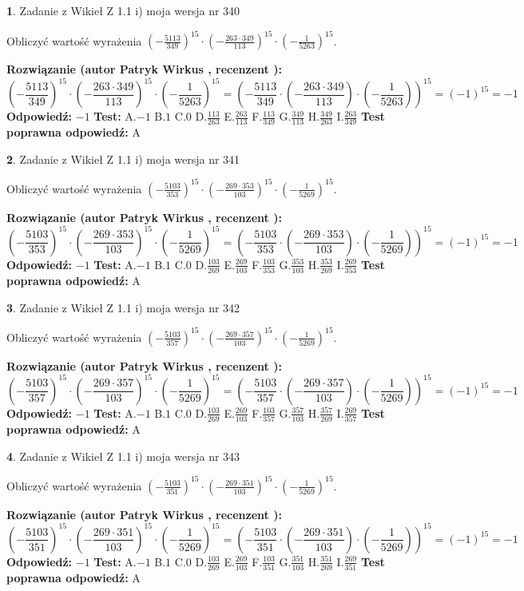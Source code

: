 \documentclass[12pt, a4paper]{article}
\theoremstyle{definition} %
\newtheorem{zad}{}
\newcommand{\zadStart}[1]{\begin{zad}#1\newline}
\newcommand{\zadStop}{\end{zad}}
\newcommand{\rozwStart}[2]{\noindent \textbf{Rozwiązanie (autor #1 , recenzent #2): }\newline}
\newcommand{\rozwStop}{\newline}
\newcommand{\odpStart}{\noindent \textbf{Odpowiedź:}\newline}
\newcommand{\odpStop}{\newline}
\newcommand{\testStart}{\noindent \textbf{Test:}\newline}
\newcommand{\testStop}{\newline}
\newcommand{\kluczStart}{\noindent \textbf{Test poprawna odpowiedź:}\newline}
\newcommand{\kluczStop}{\newline}
\begin{document}
\zadStart{Zadanie z Wikieł Z 1.1 i) moja wersja nr 340}

Obliczyć wartość wyrażenia $(-\frac{5113}{349})^{15} \cdot (-\frac{263 \cdot 349}{113})^{15} \cdot (-\frac{1}{5263})^{15}$.
\zadStop
\rozwStart{Patryk Wirkus}{}
$$(-\frac{5113}{349})^{15} \cdot (-\frac{263 \cdot 349}{113})^{15} \cdot (-\frac{1}{5263})^{15} = (-\frac{5113}{349} \cdot (-\frac{263 \cdot 349}{113}) \cdot (-\frac{1}{5263}))^{15} = (-1)^{15} = -1$$
\rozwStop
\odpStart
$-1$
\odpStop
\testStart
A.$-1$ B.$1$ C.$0$ D.$\frac{113}{263}$ E.$\frac{263}{113}$
F.$\frac{113}{349}$ G.$\frac{349}{113}$
H.$\frac{349}{263}$
I.$\frac{263}{349}$
\testStop
\kluczStart
A
\kluczStop



\zadStart{Zadanie z Wikieł Z 1.1 i) moja wersja nr 341}

Obliczyć wartość wyrażenia $(-\frac{5103}{353})^{15} \cdot (-\frac{269 \cdot 353}{103})^{15} \cdot (-\frac{1}{5269})^{15}$.
\zadStop
\rozwStart{Patryk Wirkus}{}
$$(-\frac{5103}{353})^{15} \cdot (-\frac{269 \cdot 353}{103})^{15} \cdot (-\frac{1}{5269})^{15} = (-\frac{5103}{353} \cdot (-\frac{269 \cdot 353}{103}) \cdot (-\frac{1}{5269}))^{15} = (-1)^{15} = -1$$
\rozwStop
\odpStart
$-1$
\odpStop
\testStart
A.$-1$ B.$1$ C.$0$ D.$\frac{103}{269}$ E.$\frac{269}{103}$
F.$\frac{103}{353}$ G.$\frac{353}{103}$
H.$\frac{353}{269}$
I.$\frac{269}{353}$
\testStop
\kluczStart
A
\kluczStop



\zadStart{Zadanie z Wikieł Z 1.1 i) moja wersja nr 342}

Obliczyć wartość wyrażenia $(-\frac{5103}{357})^{15} \cdot (-\frac{269 \cdot 357}{103})^{15} \cdot (-\frac{1}{5269})^{15}$.
\zadStop
\rozwStart{Patryk Wirkus}{}
$$(-\frac{5103}{357})^{15} \cdot (-\frac{269 \cdot 357}{103})^{15} \cdot (-\frac{1}{5269})^{15} = (-\frac{5103}{357} \cdot (-\frac{269 \cdot 357}{103}) \cdot (-\frac{1}{5269}))^{15} = (-1)^{15} = -1$$
\rozwStop
\odpStart
$-1$
\odpStop
\testStart
A.$-1$ B.$1$ C.$0$ D.$\frac{103}{269}$ E.$\frac{269}{103}$
F.$\frac{103}{357}$ G.$\frac{357}{103}$
H.$\frac{357}{269}$
I.$\frac{269}{357}$
\testStop
\kluczStart
A
\kluczStop



\zadStart{Zadanie z Wikieł Z 1.1 i) moja wersja nr 343}

Obliczyć wartość wyrażenia $(-\frac{5103}{351})^{15} \cdot (-\frac{269 \cdot 351}{103})^{15} \cdot (-\frac{1}{5269})^{15}$.
\zadStop
\rozwStart{Patryk Wirkus}{}
$$(-\frac{5103}{351})^{15} \cdot (-\frac{269 \cdot 351}{103})^{15} \cdot (-\frac{1}{5269})^{15} = (-\frac{5103}{351} \cdot (-\frac{269 \cdot 351}{103}) \cdot (-\frac{1}{5269}))^{15} = (-1)^{15} = -1$$
\rozwStop
\odpStart
$-1$
\odpStop
\testStart
A.$-1$ B.$1$ C.$0$ D.$\frac{103}{269}$ E.$\frac{269}{103}$
F.$\frac{103}{351}$ G.$\frac{351}{103}$
H.$\frac{351}{269}$
I.$\frac{269}{351}$
\testStop
\kluczStart
A
\kluczStop
\end{document}
